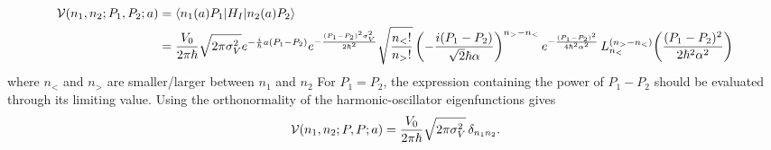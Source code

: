 \begin{importantbox}
  \begin{align}
    {\cal V}(n_1,n_2;P_1,P_2;a)&= \langle n_1(a) P_1|H_I|n_2(a) P_2\rangle  \nonumber\\
    &= \frac{V_0}{2\pi\hbar}\sqrt{{2\pi\sigma_V^2}} e^{-\frac{i}{\hbar}a(P_1-P_2)}e^{-\frac{(P_1-P_2)^2\sigma_V^2}{2\hbar^2}}\sqrt{\frac{n_<!}{n_>!}} \left(-\frac{i (P_1-P_2)  }{\sqrt{2}\hbar\alpha}\right)^{n_> - n_<} e^{-\frac{(P_1-P_2)^2 }{4\hbar^2\alpha^2}} \, L_{n_<}^{(n_> - n_<)}\!\left(\frac{(P_1-P_2)^2 }{2\hbar^2\alpha^2}\right)\label{eq:osc-V-n1n2}
  \end{align}
  where $n_<$ and $n_>$ are smaller/larger between $n_1$ and $n_2$
  For $P_1=P_2$, the expression containing the power of $P_1-P_2$
  should be evaluated through its limiting value.  Using the
  orthonormality of the harmonic-oscillator eigenfunctions gives
  \begin{align}
    {\cal V}(n_1,n_2;P,P;a)
    = \frac{V_0}{2\pi\hbar}\sqrt{2\pi\sigma_V^2}\,
    \delta_{n_1n_2}.\label{eq:osc-V-n1n2-diag}
  \end{align}
\end{importantbox}

